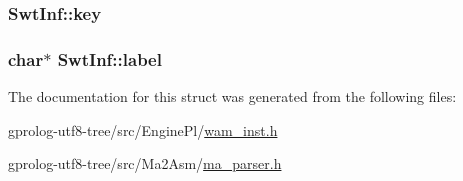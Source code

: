 \subsubsection[{\texorpdfstring{key}{key}}]{ Swt\+Inf\+::key}\hypertarget{structSwtInf_ad115955219677407a1cf8cdadc8ab19f}{}\label{structSwtInf_ad115955219677407a1cf8cdadc8ab19f}
\subsubsection[{\texorpdfstring{label}{label}}]{\setlength{\rightskip}{0pt plus 5cm}char$\ast$ Swt\+Inf\+::label}\hypertarget{structSwtInf_aca3187b48d4bc13a963b097f9e228266}{}\label{structSwtInf_aca3187b48d4bc13a963b097f9e228266}


The documentation for this struct was generated from the following files\+:\begin{DoxyCompactItemize}
\item 
gprolog-\/utf8-\/tree/src/\+Engine\+Pl/\hyperlink{wam__inst_8h}{wam\+\_\+inst.\+h}\item 
gprolog-\/utf8-\/tree/src/\+Ma2\+Asm/\hyperlink{ma__parser_8h}{ma\+\_\+parser.\+h}\end{DoxyCompactItemize}
